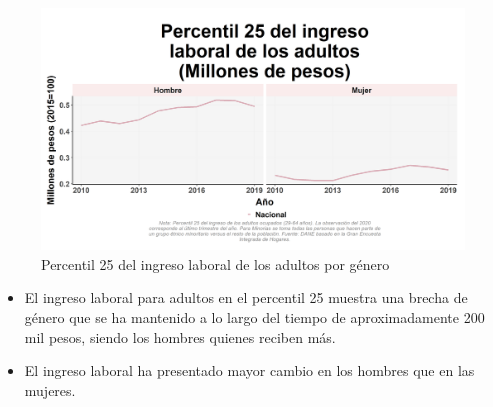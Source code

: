     \begin{figure}[H]
        \caption{Percentil 25 del ingreso laboral de los adultos por género \label{map_result_2} }
        \begin{center}
        \includegraphics[width=\textwidth,keepaspectratio]{img/var_9_trend.png}
        \end{center}
    \end{figure}
            \begin{itemize}
                \item El ingreso laboral para adultos en el percentil 25 muestra una brecha de género que se ha mantenido a lo largo del tiempo de aproximadamente 200 mil pesos, siendo los hombres quienes reciben más.
                \item El ingreso laboral ha presentado mayor cambio en los hombres que en las mujeres.
                \end{itemize}

